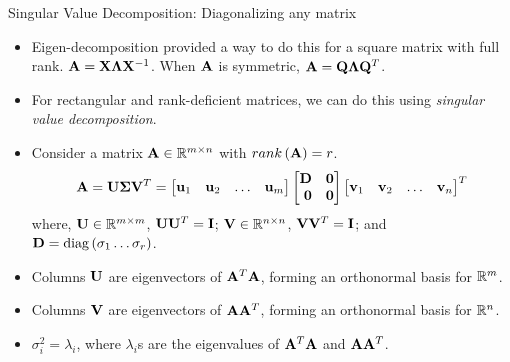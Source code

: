 \documentclass[aspectratio=169]{beamer}
\def\mf{\ensuremath\mathbf}
\def\mb{\ensuremath\mathbb}
\def\lp{\ensuremath\left(}
\def\rp{\ensuremath\right)}
\def\bmx{\ensuremath\begin{bmatrix*}[r]}
\def\emx{\ensuremath\end{bmatrix*}}
\begin{document}
\begin{frame}[t]{Singular Value Decomposition: Diagonalizing any matrix}
\begin{itemize}
    \item Eigen-decomposition provided a way to do this for a square matrix with full rank. $\mf{A} = \mf{X}\mf{\Lambda}\mf{X}^{-1}$. When $\mf{A}$ is symmetric, $\mf{A} = \mf{Q}\mf{\Lambda}\mf{Q}^T$.

    \item For rectangular and rank-deficient matrices, we can do this using \textit{singular value decomposition}.

    \item Consider a matrix $\mf{A} \in \mb{R}^{m \times n}$ with $rank\lp\mf{A}\rp = r$.
    \[ \mf{A} = \mf{U}\mf{\Sigma}\mf{V}^T = \bmx \mf{u}_1 & \mf{u}_2 & \ldots & \mf{u}_m\emx
    \bmx \mf{D} & \mf{0}\\
    \mf{0} & \mf{0} \emx \bmx \mf{v}_1 & \mf{v}_2 & \ldots & \mf{v}_n \emx^T\]
    where, $\mf{U} \in \mb{R}^{m \times m}$, $\mf{U}\mf{U}^T = \mf{I}$; $\mf{V}\in \mb{R}^{n \times n}$, $\mf{V}\mf{V}^T = \mf{I}$; and $\mf{D} = \mathrm{diag}\lp\sigma_1 \ldots \sigma_r\rp$.

    \item Columns $\mf{U}$ are eigenvectors of $\mf{A}^T\mf{A}$, forming an orthonormal basis for $\mb{R}^m$.

    \item Columns $\mf{V}$ are eigenvectors of $\mf{A}\mf{A}^T$, forming an orthonormal basis for $\mb{R}^n$.

    \item $\sigma_i^2 = \lambda_i$, where $\lambda_i$s are the eigenvalues of $\mf{A}^T\mf{A}$ and $\mf{A}\mf{A}^T$.
\end{itemize}
\end{frame}
\end{document}
